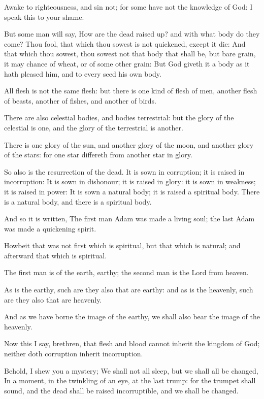 \verse Awake to righteousness, and sin not; for some have not the knowledge of God: I speak this to your shame.

\verse But some man will say, How are the dead raised up? and with what body do they come?  \verse Thou fool, that which thou sowest is not quickened, except it die: \verse And that which thou sowest, thou sowest not that body that shall be, but bare grain, it may chance of wheat, or of some other grain: \verse But God giveth it a body as it hath pleased him, and to every seed his own body.

\verse All flesh is not the same flesh: but there is one kind of flesh of men, another flesh of beasts, another of fishes, and another of birds.

\verse There are also celestial bodies, and bodies terrestrial: but the glory of the celestial is one, and the glory of the terrestrial is another.

\verse There is one glory of the sun, and another glory of the moon, and another glory of the stars: for one star differeth from another star in glory.

\verse So also is the resurrection of the dead. It is sown in corruption; it is raised in incorruption: \verse It is sown in dishonour; it is raised in glory: it is sown in weakness; it is raised in power: \verse It is sown a natural body; it is raised a spiritual body. There is a natural body, and there is a spiritual body.

\verse And so it is written, The first man Adam was made a living soul; the last Adam was made a quickening spirit.

\verse Howbeit that was not first which is spiritual, but that which is natural; and afterward that which is spiritual.

\verse The first man is of the earth, earthy; the second man is the Lord from heaven.

\verse As is the earthy, such are they also that are earthy: and as is the heavenly, such are they also that are heavenly.

\verse And as we have borne the image of the earthy, we shall also bear the image of the heavenly.

\verse Now this I say, brethren, that flesh and blood cannot inherit the kingdom of God; neither doth corruption inherit incorruption.

\verse Behold, I shew you a mystery; We shall not all sleep, but we shall all be changed, \verse In a moment, in the twinkling of an eye, at the last trump: for the trumpet shall sound, and the dead shall be raised incorruptible, and we shall be changed.


